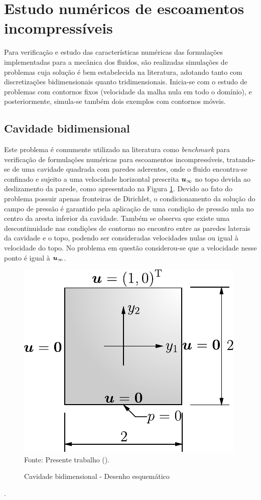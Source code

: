 \section{Estudo numéricos de escoamentos incompressíveis} \label{ExemplosMT}

Para verificação e estudo das características numéricas das formulações implementadas para a mecânica dos fluidos, são realizadas simulações de problemas cuja solução é bem estabelecida na literatura, adotando tanto com discretizações bidimensionais quanto tridimensionais. Inicia-se com o estudo de problemas com contornos fixos (velocidade da malha nula em todo o domínio), e posteriormente, simula-se também dois exemplos com contornos móveis.

\subsection{Cavidade bidimensional} \label{ex:cavity}

Este problema é comumente utilizado na literatura como \textit{benchmark} para verificação de formulações numéricas para escoamentos incompressíveis, tratando-se de uma cavidade quadrada com paredes aderentes, onde o fluido encontra-se confinado e sujeito a uma velocidade horizontal prescrita $\boldsymbol{u}_\infty$ no topo devida ao deslizamento da parede, como apresentado na Figura \ref{fig:cavity}. Devido ao fato do problema possuir apenas fronteiras de Dirichlet, o condicionamento da solução do campo de pressão é garantido pela aplicação de uma condição de pressão nula no centro da aresta inferior da cavidade. Também se observa que existe uma descontinuidade nas condições de contorno no encontro entre as paredes laterais da cavidade e o topo, podendo ser consideradas velocidades nulas ou igual à velocidade do topo. No problema em questão considerou-se que a velocidade nesse ponto é igual à $\boldsymbol{u}_\infty$.

\begin{figure}[h!]
    \centering
    \caption{Cavidade bidimensional - Desenho esquemático}
    \includegraphics[width=.4\linewidth]{Figuras/Cavity/cavidade.pdf}
    \\Fonte: Presente trabalho (\the\year).
    \label{fig:cavity}
\end{figure}.

